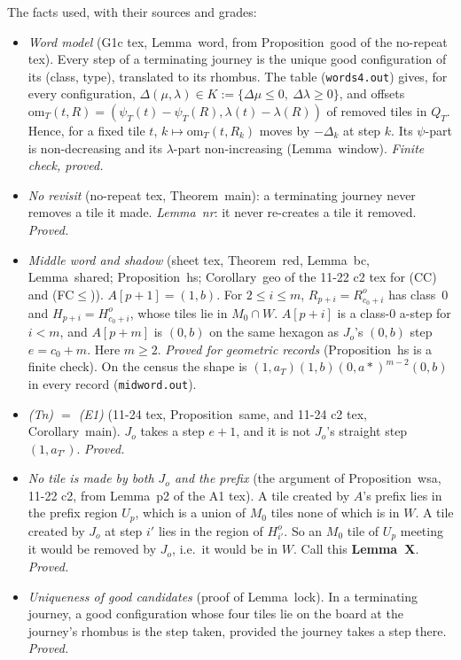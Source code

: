 \documentclass[11pt]{article}
\theoremstyle{definition}\newtheorem{definition}[theorem]{Definition}\newtheorem{remark}[theorem]{Remark}
\begin{document}
The facts used, with their sources and grades:
\begin{itemize}
\item[(F1)] \emph{Word model} (G1c tex, Lemma~word, from Proposition~good of the no-repeat tex). Every step of a terminating journey is the unique good configuration of its (class, type), translated to its rhombus. The table (\texttt{words4.out}) gives, for every configuration, $\Delta(\mu,\lambda)\in K:=\{\Delta\mu\le0,\ \Delta\lambda\ge0\}$, and offsets $\mathrm{om}_T(t,R)=(\psi_T(t)-\psi_T(R),\lambda(t)-\lambda(R))$ of removed tiles in $Q_T$. Hence, for a fixed tile $t$, $k\mapsto\mathrm{om}_T(t,R_k)$ moves by $-\Delta_k$ at step $k$. Its $\psi$-part is non-decreasing and its $\lambda$-part non-increasing (Lemma~window). \emph{Finite check, proved.}
\item[(F2)] \emph{No revisit} (no-repeat tex, Theorem~main): a terminating journey never removes a tile it made. \emph{Lemma~nr}: it never re-creates a tile it removed. \emph{Proved.}
\item[(F3)] \emph{Middle word and shadow} (sheet tex, Theorem~red, Lemma~bc, Lemma~shared; Proposition~hs; Corollary~geo of the 11-22 c2 tex for (CC) and (FC$\le$)). $A[p+1]=(1,b)$. For $2\le i\le m$, $R_{p+i}=R^o_{c_0+i}$ has class~0 and $H_{p+i}=H^o_{c_0+i}$, whose tiles lie in $M_0\cap W$. $A[p+i]$ is a class-0 a-step for $i<m$, and $A[p+m]$ is $(0,b)$ on the same hexagon as $J_o$'s $(0,b)$ step $e=c_0+m$. Here $m\ge2$. \emph{Proved for geometric records} (Proposition~hs is a finite check). On the census the shape is $(1,a_T)(1,b)(0,a\ast)^{m-2}(0,b)$ in every record (\texttt{midword.out}).
\item[(F4)] \emph{(Tn) $=$ (E1)} (11-24 tex, Proposition~same, and 11-24 c2 tex, Corollary~main). $J_o$ takes a step $e+1$, and it is not $J_o$'s straight step $(1,a_{T'})$. \emph{Proved.}
\item[(F5)] \emph{No tile is made by both $J_o$ and the prefix} (the argument of Proposition~wsa, 11-22 c2, from Lemma~p2 of the A1 tex). A tile created by $A$'s prefix lies in the prefix region $U_p$, which is a union of $M_0$ tiles none of which is in $W$. A tile created by $J_o$ at step $i'$ lies in the region of $H^o_{i'}$. So an $M_0$ tile of $U_p$ meeting it would be removed by $J_o$, i.e.\ it would be in $W$. Call this \textbf{Lemma~X}. \emph{Proved.}
\item[(F6)] \emph{Uniqueness of good candidates} (proof of Lemma~lock). In a terminating journey, a good configuration whose four tiles lie on the board at the journey's rhombus is the step taken, provided the journey takes a step there. \emph{Proved.}

\end{itemize}
\end{document}
